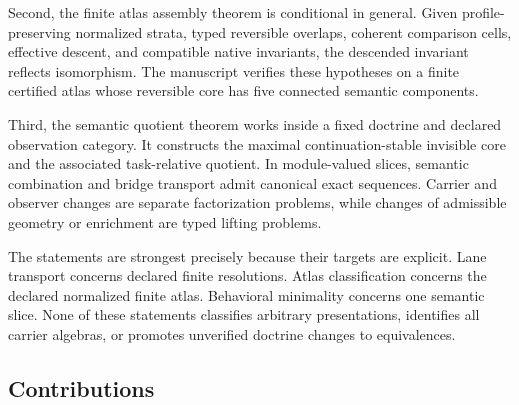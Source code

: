 \documentclass[11pt]{article}
\theoremstyle{definition}
\theoremstyle{remark}
\begin{document}
Second, the finite atlas assembly theorem is conditional in general. Given profile-preserving normalized strata, typed reversible overlaps, coherent comparison cells, effective descent, and compatible native invariants, the descended invariant reflects isomorphism. The manuscript verifies these hypotheses on a finite certified atlas whose reversible core has five connected semantic components.

Third, the semantic quotient theorem works inside a fixed doctrine and declared observation category. It constructs the maximal continuation-stable invisible core and the associated task-relative quotient. In module-valued slices, semantic combination and bridge transport admit canonical exact sequences. Carrier and observer changes are separate factorization problems, while changes of admissible geometry or enrichment are typed lifting problems.

The statements are strongest precisely because their targets are explicit. Lane transport concerns declared finite resolutions. Atlas classification concerns the declared normalized finite atlas. Behavioral minimality concerns one semantic slice. None of these statements classifies arbitrary presentations, identifies all carrier algebras, or promotes unverified doctrine changes to equivalences.

\subsection{Contributions}
\end{document}
